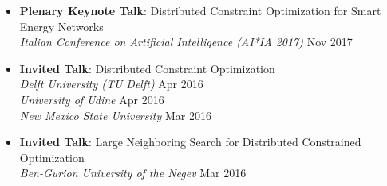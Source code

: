 \begin{itemize}
	\item {\bf Plenary Keynote Talk}: 
	Distributed Constraint Optimization for Smart Energy Networks\\
    {\em Italian Conference on Artificial Intelligence (AI*IA 2017)}
	\hfill {Nov 2017}

	\item {\bf Invited Talk}: Distributed Constraint Optimization\\
	{\em Delft University (TU Delft)} \hfill {Apr 2016}\\
 	{\em University of Udine} \hfill {Apr 2016} \\ 
	{\em New Mexico State University} \hfill {Mar 2016}
	
	\item {\bf Invited Talk}: Large Neighboring Search for Distributed Constrained Optimization\\
	{\em Ben-Gurion University of the Negev} \hfill {Mar 2016}
\end{itemize}
